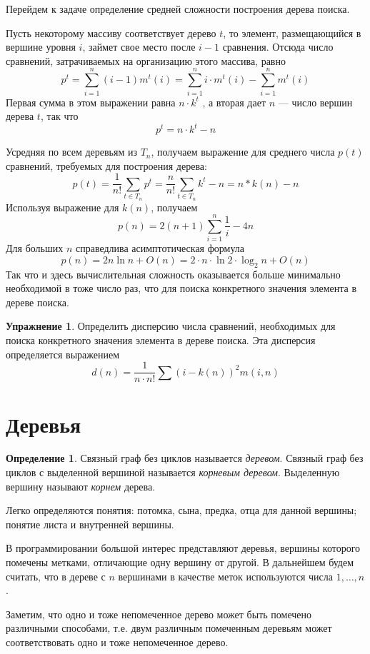 \documentclass[12pt,a4paper]{article}
\theoremstyle{plain}
\theoremstyle{definition}
\newtheorem{definition}{Определение}
\newtheorem*{task}{Упражнение}
\theoremstyle{remark}
\begin{document}
Перейдем к задаче определение средней сложности построения дерева поиска.

Пусть некоторому массиву соответствует дерево $t$, то элемент, размещающийся в вершине уровня $i$, займет свое место после $i-1$ сравнения. Отсюда число сравнений, затрачиваемых на организацию этого массива, равно
\[ p^t = \sum_{i=1}^n (i-1)m^t(i) = \sum_{i=1}^n i\cdot m^t(i) - \sum_{i=1}^n m^t(i) \]
Первая сумма в этом выражении равна $n\cdot k^t$ , а вторая дает $n$ --- число вершин дерева $t$, так что
\[ p^t =n\cdot k^t - n \]

Усредняя по всем деревьям из $T_n$, получаем выражение для среднего числа $p(t)$ сравнений, требуемых для построения дерева:
\[ p(t) = \frac{1}{n!} \sum_{t\in T_n} p^t = \frac{n}{n!} \sum_{t\in T_n} k^t - n = n*k(n) - n \]
Используя выражение для $k(n)$, получаем
\[ p(n) = 2(n+1)\sum_{i=1}^n \frac{1}{i} - 4n \]
Для больших $n$ справедлива асимптотическая формула
\[ p(n) = 2 n \ln n + O(n) = 2\cdot n\cdot \ln 2 \cdot \log_2 n + O(n) \]
Так что и здесь вычислительная сложность оказывается больше минимально необходимой в тоже число раз, что для поиска конкретного значения элемента в дереве поиска.

\begin{task}
Определить дисперсию числа сравнений, необходимых для поиска конкретного значения элемента в дереве поиска. Эта дисперсия определяется выражением
\[ d(n) = \frac{1}{n\cdot n!} \sum (i-k(n))^2 m(i, n) \]
\end{task}

\section{Деревья}

\begin{definition}
Связный граф без циклов называется \emph{деревом}. Связный граф без циклов с выделенной вершиной называется \emph{корневым деревом}. Выделенную вершину называют \emph{корнем} дерева.
\end{definition}

Легко определяются понятия: потомка, сына, предка, отца для данной вершины; понятие листа и внутренней вершины.

В программировании большой интерес представляют деревья, вершины которого помечены метками, отличающие одну вершину от другой. В дальнейшем будем считать, что в дереве с $n$ вершинами в качестве меток используются числа $1,\ldots,n$.

Заметим, что одно и тоже непомеченное дерево может быть помечено различными способами, т.е. двум различным помеченным деревьям может соответствовать одно и тоже непомеченное дерево.
\end{document}
